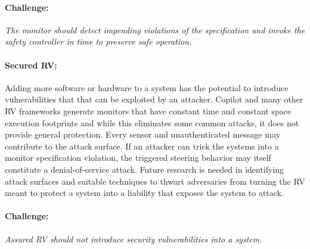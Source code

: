 \paragraph{Challenge:} \emph{The monitor should detect impending violations of
  the specification and invoke the safety controller in time to
  preserve safe operation.}


\paragraph{Secured RV:} Adding more software or hardware to a system
has the potential to introduce vulnerabilities that that can be
exploited by an attacker.  Copilot and many other RV frameworks
generate monitors that have constant time and constant space execution
footprints and while this eliminates some common attacks, it does not
provide general protection. Every sensor and unauthenticated message
may contribute to the attack surface. If an attacker can trick the
systems into a monitor specification violation, the triggered steering
behavior may itself constitute a denial-of-service attack.  Future
research is needed in identifying attack surfaces and suitable
techniques to thwart adversaries from turning the RV meant to protect
a system into a liability that exposes the system to attack.

\paragraph{Challenge:} \emph{Assured RV should not introduce security
vulnerabilities into a system.} 



